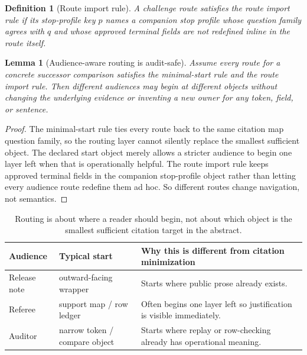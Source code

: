 \documentclass[11pt]{article}
\newtheorem{definition}{Definition}
\newtheorem{lemma}{Lemma}
\begin{document}
\begin{definition}[Route import rule]
A challenge route satisfies the \emph{route import rule} if its stop-profile key $p$ names a companion stop profile whose question family agrees with $q$ and whose approved terminal fields are not redefined inline in the route itself.
\end{definition}

\begin{lemma}[Audience-aware routing is audit-safe]
Assume every route for a concrete successor comparison satisfies the minimal-start rule and the route import rule.
Then different audiences may begin at different objects without changing the underlying evidence or inventing a new owner for any token, field, or sentence.
\end{lemma}

\begin{proof}
The minimal-start rule ties every route back to the same citation map question family, so the routing layer cannot silently replace the smallest sufficient object.
The declared start object merely allows a stricter audience to begin one layer left when that is operationally helpful.
The route import rule keeps approved terminal fields in the companion stop-profile object rather than letting every audience route redefine them ad hoc.
So different routes change navigation, not semantics.
\end{proof}

\begin{table}[t]
\centering
\small
\begin{tabularx}{\linewidth}{@{}l l X@{}}
\toprule
Audience & Typical start & Why this is different from citation minimization \\
\midrule
Release note & outward-facing wrapper & Starts where public prose already exists. \\
Referee & support map / row ledger & Often begins one layer left so justification is visible immediately. \\
Auditor & narrow token / compare object & Starts where replay or row-checking already has operational meaning. \\
\bottomrule
\end{tabularx}
\caption{Routing is about where a reader should begin, not about which object is the smallest sufficient citation target in the abstract.}
\label{tab:audiences}
\end{table}
\end{document}
